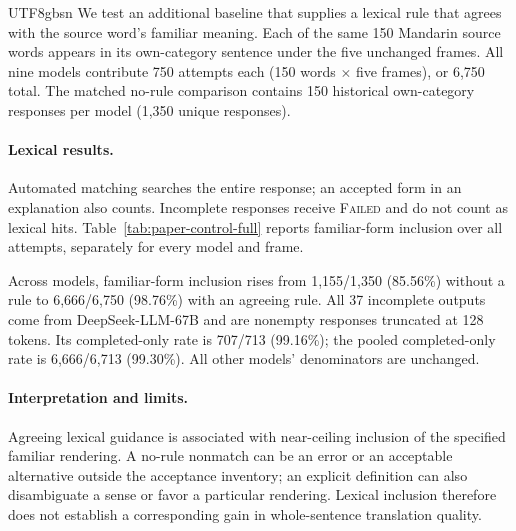 \documentclass[11pt]{article}
\begin{document}
\begin{CJK*}{UTF8}{gbsn}
We test an additional baseline that supplies
a lexical rule that agrees with the source word's familiar meaning. Each of the same 150
Mandarin source words appears in its own-category sentence under the five
unchanged frames. All nine models contribute 750 attempts each (150 words $\times$ five
frames), or 6,750 total. 
The matched no-rule comparison contains 150 historical own-category responses per model (1,350 unique responses). 


\paragraph{Lexical results.}
Automated matching searches the entire response; an accepted
form in an explanation also counts. Incomplete responses receive
\textsc{Failed} and do not count as lexical hits. Table~\ref{tab:paper-control-full}
reports familiar-form inclusion over all attempts, separately for every model
and frame.

Across models, familiar-form inclusion rises from 1,155/1,350 (85.56\%) without
a rule to 6,666/6,750 (98.76\%) with an agreeing rule. All 37 incomplete outputs
come from DeepSeek-LLM-67B and are nonempty responses truncated at 128 tokens.
Its completed-only rate is 707/713 (99.16\%); the pooled completed-only rate is
6,666/6,713 (99.30\%). All other models' denominators are unchanged.

\paragraph{Interpretation and limits.}
Agreeing lexical guidance is associated with near-ceiling inclusion of the
specified familiar rendering. A no-rule nonmatch can be an error or an
acceptable alternative outside the acceptance inventory; an explicit definition
can also disambiguate a sense or favor a particular rendering. 
Lexical inclusion therefore does not establish a corresponding gain in whole-sentence translation quality.



\end{CJK*}
\end{document}
